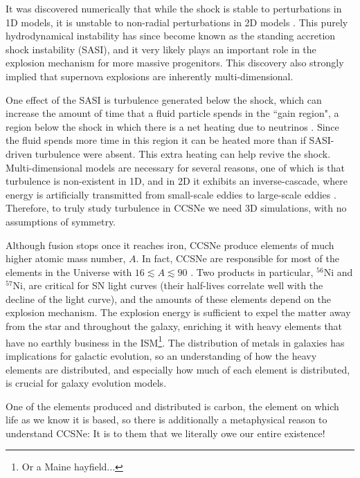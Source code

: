 
It was discovered numerically that while the shock is stable to
perturbations in 1D models, it is unstable to non-radial perturbations
in 2D models \citep{bmd2003}.
This purely hydrodynamical instability has since become known as the
standing accretion shock instability (SASI), and it very likely plays an
important role in the explosion mechanism for more massive progenitors.
This discovery also strongly implied that supernova explosions are
inherently multi-dimensional.

One effect of the SASI is turbulence generated below the shock,
which can increase the amount of time that a fluid particle spends
in the ``gain region", a region below the shock in which there is a
net heating due to neutrinos \citep{co2015}.
Since the fluid spends more time in this region it can be heated more than if
SASI-driven turbulence were absent.
This extra heating can help revive the shock.
Multi-dimensional models are necessary for several reasons,
one of which is that turbulence is non-existent in 1D, and in 2D it
exhibits an inverse-cascade, where energy is artificially transmitted
from small-scale eddies to large-scale eddies \citep{yem2017}.
Therefore, to truly study turbulence in CCSNe we need 3D simulations,
with no assumptions of symmetry.

Although fusion stops once it reaches iron, CCSNe produce elements of much
higher atomic mass number, $A$.
In fact, CCSNe are responsible for most of the elements in the Universe with
$16\lesssim A\lesssim90$ \citep{bw2017}.
Two products in particular, $^{56}$Ni and $^{57}$Ni, are critical for SN light
curves (their half-lives correlate well with the decline of the light curve),
and the amounts of these elements depend on the explosion mechanism.
The explosion energy is sufficient to expel the matter away from the star
and throughout the galaxy, enriching it with heavy elements that have
no earthly business in the ISM\footnote{Or a Maine hayfield...}.
The distribution of metals in galaxies has implications for galactic
evolution, so an understanding of how the heavy elements are distributed,
and especially how much of each element is distributed,
is crucial for galaxy evolution models.

One of the elements produced and distributed is carbon,
the element on which life as we know it is based, so there is additionally
a metaphysical reason to understand CCSNe:
It is to them that we literally owe our entire existence!

